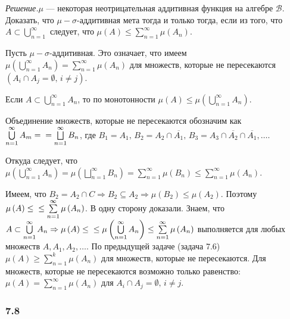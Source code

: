 \textit{Решение.}$ \mu $ --- некоторая неотрицательная аддитивная функция на алгебре $ \mathcal{B} $.
Доказать, что $ \mu - \sigma $-аддитивная мета тогда и только тогда, если из того,
что $A \subset \bigcup \limits_{n=1}^{ \infty }$ следует, что $ \mu \left( A \right) \leq \sum \limits_{n=1}^{ \infty } \mu \left( A_n \right) $.

Пусть $ \mu - \sigma $-аддитивная.
Это означает,
что имеем $ \mu \left( \bigcup \limits_{n=1}^{ \infty } A_n \right) = \sum \limits_{n=1}^{ \infty } \mu \left( A_n \right) $ для множеств,
которые не пересекаются $ \left( A_i \cap A_j = \emptyset, \, i \neq j \right) $.

Если $A \subset \bigcup \limits_{n=1}^{ \infty } A_n$, то по монотонности $ \mu \left( A \right) \leq \mu \left( \bigcup \limits_{n=1}^{ \infty } A_n \right) $.

Объединение множеств, которые не пересекаются обозначим как $ \bigcup \limits_{n=1}^{ \infty } A_m = \\
= \bigsqcup \limits_{n=1}^{ \infty } B_n$,
где $B_1 = A_1, \, B_2 = A_2 \cap \overline{A_1}, \, B_3 = A_3 \cap \overline{A_2} \cap \overline{A_1}, \dotsc $.

Откуда следует,
что
$ \mu \left( \bigcup \limits_{n=1}^{ \infty } A_n \right) =
\mu \left( \bigsqcup \limits_{n=1}^{ \infty } B_n \right) =
\sum \limits_{n=1}^{ \infty } \mu \left( B_n \right) \leq
\sum \limits_{n=1}^{ \infty } \mu \left( A_n \right) $.

Имеем, что $B_2 = A_2 \cap C \Rightarrow B_2 \subseteq A_2 \Rightarrow \mu \left( B_2 \right) \leq \mu \left( A_2 \right) $.
Поэтому $ \mu \left( A \right) \leq \\
\leq \sum \limits_{n=1}^{ \infty } \mu \left( A_n \right) $.
В одну сторону доказали.
Знаем,
что
$A \subset \bigcup \limits_{n=1}^{ \infty } A_n \Rightarrow
\mu \left( A \right) \leq \\
\leq \mu \left( \bigcup \limits_{n=1}^{ \infty } A_n \right) \leq
\sum \limits_{n=1}^{ \infty } \mu \left( A_n \right) $
выполняется для любых множеств $A, A_1, A_2, \dotsc $.
По предыдущей задаче (задача 7.6) $ \mu \left( A \right) \geq \sum \limits_{n=1}^k \mu \left( A_n \right) $ для множеств, которые не пересекаются.
Для множеств, которые не пересекаются возможно только равенство:
$ \mu \left( A \right) = \sum \limits_{n=1}^{ \infty } \mu \left( A_n \right) $ для $A_i \cap A_j = \emptyset, \, i \neq j$.

\subsubsection*{7.8}

